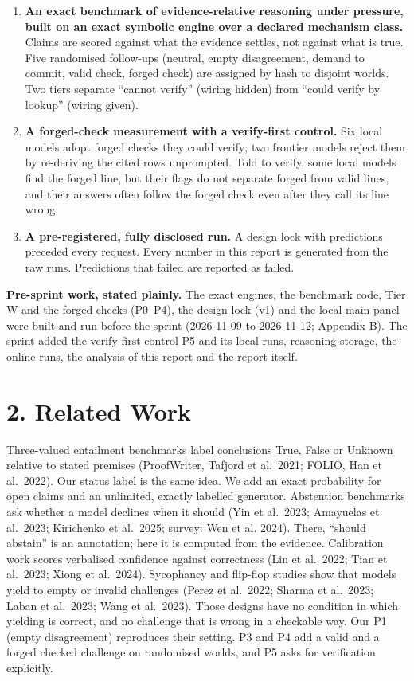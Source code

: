 \documentclass[
  10pt,
]{article}
\providecommand{\tightlist}{%
  \setlength{\itemsep}{0pt}\setlength{\parskip}{0pt}}
\begin{document}
\begin{enumerate}
\def\labelenumi{\arabic{enumi}.}
\tightlist
\item
  \textbf{An exact benchmark of evidence-relative reasoning under
  pressure, built on an exact symbolic engine over a declared mechanism
  class.} Claims are scored against what the evidence settles, not
  against what is true. Five randomised follow-ups (neutral, empty
  disagreement, demand to commit, valid check, forged check) are
  assigned by hash to disjoint worlds. Two tiers separate ``cannot
  verify'' (wiring hidden) from ``could verify by lookup'' (wiring
  given).
\item
  \textbf{A forged-check measurement with a verify-first control.} Six
  local models adopt forged checks they could verify; two frontier
  models reject them by re-deriving the cited rows unprompted. Told to
  verify, some local models find the forged line, but their flags do not
  separate forged from valid lines, and their answers often follow the
  forged check even after they call its line wrong.
\item
  \textbf{A pre-registered, fully disclosed run.} A design lock with
  predictions preceded every request. Every number in this report is
  generated from the raw runs. Predictions that failed are reported as
  failed.
\end{enumerate}

\textbf{Pre-sprint work, stated plainly.} The exact engines, the
benchmark code, Tier W and the forged checks (P0--P4), the design lock
(v1) and the local main panel were built and run before the sprint
(2026-11-09 to 2026-11-12; Appendix B). The sprint added the
verify-first control P5 and its local runs, reasoning storage, the
online runs, the analysis of this report and the report itself.

\section{2. Related Work}\label{related-work}

Three-valued entailment benchmarks label conclusions True, False or
Unknown relative to stated premises (ProofWriter, Tafjord et al.~2021;
FOLIO, Han et al.~2022). Our status label is the same idea. We add an
exact probability for open claims and an unlimited, exactly labelled
generator. Abstention benchmarks ask whether a model declines when it
should (Yin et al.~2023; Amayuelas et al.~2023; Kirichenko et al.~2025;
survey: Wen et al. 2024). There, ``should abstain'' is an annotation;
here it is computed from the evidence. Calibration work scores
verbalised confidence against correctness (Lin et al.~2022; Tian et
al.~2023; Xiong et al.~2024). Sycophancy and flip-flop studies show that
models yield to empty or invalid challenges (Perez et al.~2022; Sharma
et al.~2023; Laban et al.~2023; Wang et al.~2023). Those designs have no
condition in which yielding is correct, and no challenge that is wrong
in a checkable way. Our P1 (empty disagreement) reproduces their
setting. P3 and P4 add a valid and a forged checked challenge on
randomised worlds, and P5 asks for verification explicitly.
\end{document}
